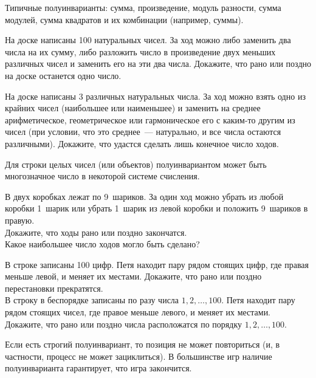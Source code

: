 Типичные полуинварианты: сумма, произведение, модуль разности, сумма модулей,
сумма квадратов и их комбинации (например, суммы).

\begin{problems}

\item
На доске написаны 100 натуральных чисел.
За ход можно либо заменить два числа на их сумму, либо разложить число
в произведение двух меньших различных чисел и заменить его на эти два числа.
Докажите, что рано или поздно на доске останется одно число.

\item
На доске написаны 3 различных натуральных числа.
За ход можно взять одно из крайних чисел (наибольшее или наименьшее) и заменить
на среднее арифметическое, геометрическое или гармоническое его с каким-то
другим из чисел (при условии, что это среднее~--- натурально, и все числа
остаются различными).
Докажите, что удастся сделать лишь конечное число ходов.

\end{problems}

Для строки целых чисел (или объектов) полуинвариантом может быть многозначное
число в некоторой системе счисления.

\begin{problems}

\item
В двух коробках лежат по 9~шариков.
За один ход можно убрать из любой коробки 1~шарик или убрать 1~шарик из левой
коробки и положить 9~шариков в правую.
\\
\subproblem
Докажите, что ходы рано или поздно закончатся.
\\
\subproblem
Какое наибольшее число ходов могло быть сделано?

\item
\subproblem
В строке записаны 100 цифр.
Петя находит пару рядом стоящих цифр, где правая меньше левой, и меняет
их местами.
Докажите, что рано или поздно перестановки прекратятся.
\\
\subproblem
В строку в беспорядке записаны по разу числа $1, 2, \ldots, 100$.
Петя находит пару рядом стоящих чисел, где правое меньше левого, и меняет
их местами.
Докажите, что рано или поздно числа расположатся по порядку
$1, 2, \ldots, 100$.

\end{problems}

Если есть строгий полуинвариант, то позиция не может повториться
(и, в частности, процесс не может зациклиться).
В большинстве игр наличие полуинварианта гарантирует, что игра закончится.

